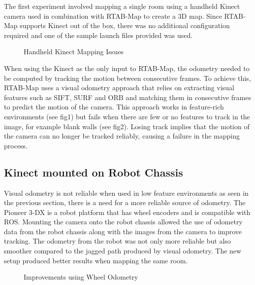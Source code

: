 \documentclass[conference, letterpaper]{IEEEtran}
\begin{document}
The first experiment involved mapping a single room using a handheld Kinect 
camera used in combination with RTAB-Map to create a 3D map. Since RTAB-Map 
supports Kinect out of the box, there was no additional configuration required
and one of the sample launch files provided was used. 

\begin{figure}[ht]
  \centering
  \hfill
  \caption{Handheld Kinect Mapping Issues}  
\end{figure}

When using the Kinect as the only input to RTAB-Map, the odometry needed to be 
computed by tracking the motion between consecutive frames. To achieve this, 
RTAB-Map uses a visual odometry approach that relies on extracting visual 
features such as SIFT, SURF and ORB and matching them in consecutive frames to 
predict the motion of the camera. This approach works in feature-rich 
environments (see fig1) but fails when there are few or no features to track in 
the image, for example blank walls (see fig2). Losing track implies that the 
motion of the camera can no longer be tracked reliably, causing a failure in the 
mapping process.

\subsection{Kinect mounted on Robot Chassis}

Visual odometry is not reliable when used in low feature environments as seen in 
the previous section, there is a need for a more reliable source of odometry. 
The Pioneer 3-DX is a robot platform that has wheel encoders and is compatible 
with ROS. Mounting the camera onto the robot chassis allowed the use of odometry 
data from the robot chassis along with the images from the camera to improve 
tracking. The odometry from the robot was not only more reliable but also 
smoother compared to the jagged path produced by visual odometry. The new setup 
produced better results when mapping the same room.

\begin{figure}[ht]
  \centering
  \hfill
  
  \hfill
  \hfill
  \caption{Improvements using Wheel Odometry}  
\end{figure}
\end{document}
